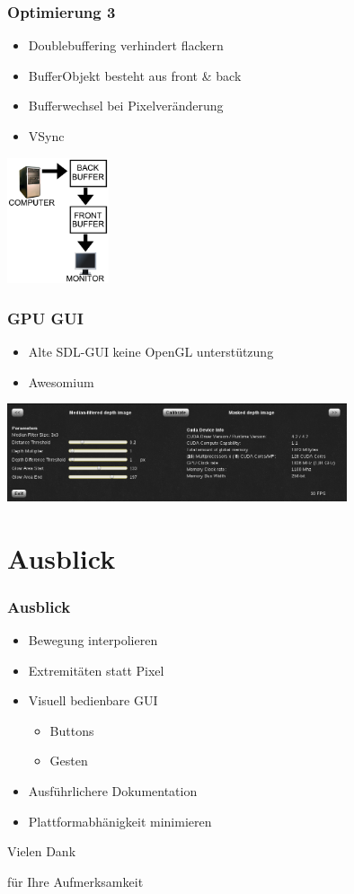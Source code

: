 \documentclass{beamer}
\begin{document}
\begin{frame}
\frametitle{Optimierung 3}
\begin{itemize}
\item Doublebuffering verhindert flackern
\item BufferObjekt besteht aus front \& back
\item Bufferwechsel bei Pixelveränderung
\item VSync
\end{itemize}
\hspace*{4cm}\includegraphics[width=3cm]{double.png}
\end{frame}

\begin{frame}
\frametitle{GPU GUI}
\begin{itemize}
\item Alte SDL-GUI keine OpenGL unterstützung
\item Awesomium
\end{itemize}
\hspace*{1,2cm}\includegraphics[width=10cm]{gui.png}
\end{frame}

\section{Ausblick}

\begin{frame}
\frametitle{Ausblick}
\begin{itemize}
	\item Bewegung interpolieren
	\item Extremitäten statt Pixel
	\item Visuell bedienbare GUI
	\begin{itemize}
		\item Buttons
		\item Gesten
	\end{itemize}
	\item Ausführlichere Dokumentation
	\item Plattformabhänigkeit minimieren
\end{itemize}
\end{frame}

\begin{frame}
\Huge
\centerline{Vielen Dank}
\centerline{für Ihre Aufmerksamkeit}
\end{frame}
\end{document}
